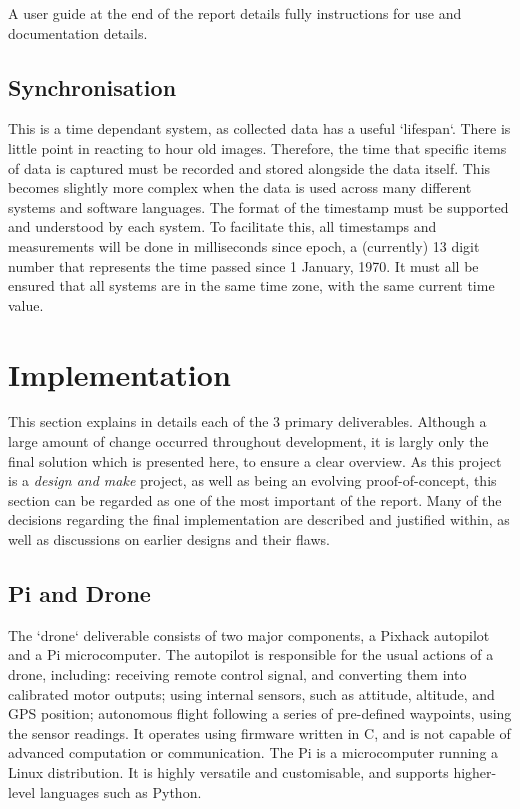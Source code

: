 \documentclass{article}
\begin{document}
A user guide at the end of the report details fully instructions for use and documentation details.

\subsection{Synchronisation}
This is a time dependant system, as collected data has a useful `lifespan`. There is little point in reacting to hour old images. Therefore, the time that specific items of data is captured must be recorded and stored alongside the data itself. This becomes slightly more complex when the data is used across many different systems and software languages. The format of the timestamp must be supported and understood by each system. To facilitate this, all timestamps and measurements will be done in milliseconds since epoch, a (currently) 13 digit number that represents the time passed since 1 January, 1970. It must all be ensured that all systems are in the same time zone, with the same current time value.

\section{Implementation}
This section explains in details each of the 3 primary deliverables. Although a large amount of change occurred throughout development, it is largly only the final solution which is presented here, to ensure a clear overview. As this project is a \textit{design and make} project, as well as being an evolving proof-of-concept, this section can be regarded as one of the most important of the report. Many of the decisions regarding the final implementation are described and justified within, as well as discussions on earlier designs and their flaws. 
 
\subsection{Pi and Drone}
The `drone` deliverable consists of two major components, a Pixhack autopilot and a Pi microcomputer. The autopilot is responsible for the usual actions of a drone, including: receiving remote control signal, and converting them into calibrated motor outputs; using internal sensors, such as attitude, altitude, and GPS position; autonomous flight following a series of pre-defined waypoints, using the sensor readings. It operates using firmware written in C, and is not capable of advanced computation or communication. The Pi is a microcomputer running a Linux distribution. It is highly versatile and customisable, and supports higher-level languages such as Python. 
\end{document}
